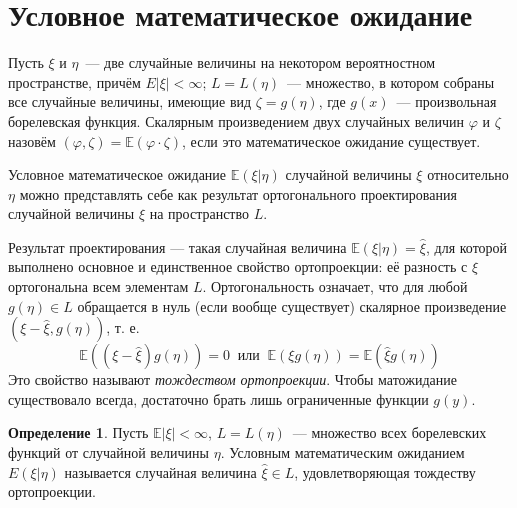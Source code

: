 \documentclass[oneside,final,14pt]{extreport}
\theoremstyle{plain}
\theoremstyle{definition}
\newtheorem*{defn}{Определение}
\theoremstyle{named}
\begin{document}
\section{Условное математическое ожидание}

Пусть $\xi$ и $\eta$~--- две случайные величины на некотором вероятностном пространстве, причём $E|\xi|<\infty$; $L=L(\eta)$~--- множество, в котором собраны все случайные величины, имеющие вид $\zeta=g(\eta)$, где $g(x)$~--- произвольная борелевская функция. Скалярным произведением двух случайных величин $\varphi$ и $\zeta$ назовём $(\varphi, \zeta)=\mathbb{E}(\varphi \cdot \zeta)$, если это математическое ожидание существует.

Условное математическое ожидание $\mathbb{E}(\xi | \eta)$ случайной величины $\xi$ относительно $\eta$ можно представлять себе как результат ортогонального проектирования случайной величины $\xi$ на пространство $L$.

Результат проектирования — такая случайная величина $\mathbb{E}(\xi | \eta)=\widehat{\xi}$, для которой выполнено основное и единственное свойство ортопроекции: её разность с $\xi$ ортогональна всем элементам $L$. Ортогональность означает, что для любой $g(\eta) \in L$ обращается в нуль (если вообще существует) скалярное произведение $(\xi-\widehat{\xi}, g(\eta))$, т. е.
\begin{equation*}
    \mathbb{E}((\xi-\widehat{\xi}) g(\eta))=0~ \text{ или }~ \mathbb{E}(\xi g(\eta))=\mathbb{E}(\widehat{\xi} g(\eta))
\end{equation*}
Это свойство называют {\it тождеством ортопроекции}. Чтобы матожидание существовало всегда, достаточно брать лишь ограниченные функции $g(y)$.

\begin{defn}
    Пусть $\mathbb{E}|\xi|<\infty$, $L=L(\eta)$~--- множество всех борелевских функций от случайной величины $\eta$. Условным математическим ожиданием $E(\xi | \eta)$ называется случайная величина $\widehat{\xi} \in L$, удовлетворяющая тождеству ортопроекции.
\end{defn}
\end{document}
